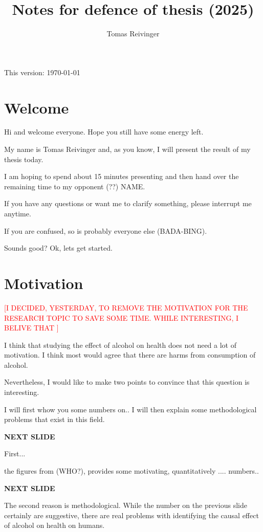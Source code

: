 \documentclass[12pt]{article}
\title{Notes for defence of thesis (2025)}
\date{}
\author{Tomas Reivinger}
\newcommand{\TODO}[1]{\textcolor{red}{[#1]}}
\begin{document}
\maketitle
\thispagestyle{empty} %
\begin{center} This version: \today\end{center}

\section{Welcome}
Hi and welcome everyone. Hope you still have some energy left.

My name is Tomas Reivinger and, as you know, I will present the result of my thesis today. 

I am hoping to spend about 15 minutes presenting and then hand over the remaining time to my opponent (??) NAME. 

If you have any questions or want me to clarify something, please interrupt me anytime. 

If you are confused, so is probably everyone else (BADA-BING).

Sounds good? Ok, lets get started.


\section{Motivation}

\TODO{I DECIDED, YESTERDAY, TO REMOVE THE MOTIVATION FOR THE RESEARCH TOPIC TO SAVE SOME TIME. WHILE INTERESTING, I BELIVE THAT }

I think that studying the effect of alcohol on health does not need a lot of motivation. I think most would agree that there are harms from consumption of alcohol.


Nevertheless, I would like to make two points to convince that this question is interesting. 

I will first whow you some numbers on.. I will then explain some methodological problems that exist in this field. 

\textbf{NEXT SLIDE}

First...

the figures from (WHO?), provides some motivating, quantitatively .... numbers..

\textbf{NEXT SLIDE}

The second reason is methodological. While the number on the previous slide certainly are suggestive, there are real problems with identifying the causal effect of alcohol on health on humans.
\end{document}
